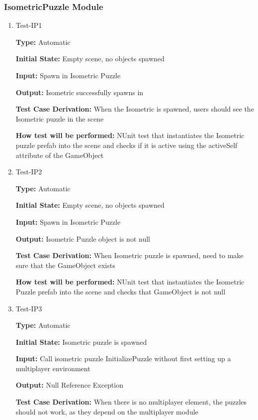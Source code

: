 \documentclass[12pt, titlepage]{article}
\begin{document}
 \subsubsection{IsometricPuzzle Module}
 
 \begin{enumerate}
 
\item{Test-IP1\\}

\textbf{Type:} Automatic
 
\textbf{Initial State:} Empty scene, no objects spawned

\textbf{Input:} Spawn in Isometric Puzzle

\textbf{Output:} Isometric successfully spawns in

\textbf{Test Case Derivation:} When the Isometric is spawned, users should see the Isometric puzzle in the scene

\textbf{How test will be performed:} NUnit test that instantiates the Isometric puzzle prefab into the scene and checks if it is active using the activeSelf attribute of the GameObject

\item{Test-IP2\\}

\textbf{Type:} Automatic
 
\textbf{Initial State:} Empty scene, no objects spawned

\textbf{Input:} Spawn in Isometric Puzzle

\textbf{Output:} Isometric Puzzle object is not null

\textbf{Test Case Derivation:} When Isometric puzzle is spawned, need to make sure that the GameObject exists

\textbf{How test will be performed:} NUnit test that instantiates the Isometric Puzzle prefab into the scene and checks that GameObject is not null

\item{Test-IP3\\}

\textbf{Type:} Automatic
 
\textbf{Initial State:} Isometric puzzle is spawned

\textbf{Input:} Call isometric puzzle InitializePuzzle without first setting up a multiplayer environment

\textbf{Output:} Null Reference Exception

\textbf{Test Case Derivation:} When there is no multiplayer element, the puzzles should not work, as they depend on the multiplayer module


\end{enumerate}
\end{document}
